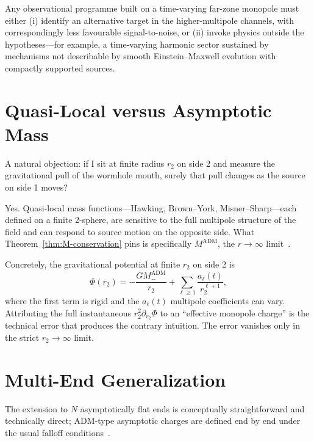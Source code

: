 \documentclass[aps,prd,onecolumn,nofootinbib,superscriptaddress]{revtex4-2}
\begin{document}
Any observational programme built on a time-varying far-zone monopole must
either (i) identify an alternative target in the higher-multipole channels, with
correspondingly less favourable signal-to-noise, or (ii) invoke physics outside
the hypotheses---for example, a time-varying harmonic sector sustained by
mechanisms not describable by smooth Einstein--Maxwell evolution with
compactly supported sources.

\section{Quasi-Local versus Asymptotic Mass}
\label{sec:quasilocal}

A natural objection: if I sit at finite radius $r_2$ on side 2 and measure the
gravitational pull of the wormhole mouth, surely that pull changes as the source
on side 1 moves?

Yes.  Quasi-local mass functions---Hawking, Brown--York, Misner--Sharp---each
defined on a finite 2-sphere, are sensitive to the full multipole structure of
the field and can respond to source motion on the opposite side.  What
Theorem~\ref{thm:M-conservation} pins is specifically $M^{\mathrm{ADM}}$, the
$r\to\infty$ limit~\cite{BrownYork1993Quasilocal,Szabados2009Quasilocal}.

Concretely, the gravitational potential at finite $r_2$ on side 2 is
\begin{equation}
  \Phi(r_2) = -\frac{G M_-^{\mathrm{ADM}}}{r_2}
  + \sum_{\ell\ge 1}\frac{a_\ell(t)}{r_2^{\ell+1}},
\end{equation}
where the first term is rigid and the $a_\ell(t)$ multipole coefficients can
vary.  Attributing the full instantaneous $r_2^2\partial_{r_2}\Phi$ to an
``effective monopole charge'' is the technical error that produces the contrary
intuition.  The error vanishes only in the strict $r_2\to\infty$ limit.

\section{Multi-End Generalization}
\label{sec:multiend}

The extension to $N$ asymptotically flat ends is conceptually straightforward
and technically direct; ADM-type asymptotic charges are defined end by end
under the usual falloff conditions~\cite{Bartnik1986Mass,Chrusciel2020ConstraintEquations}.
\end{document}
